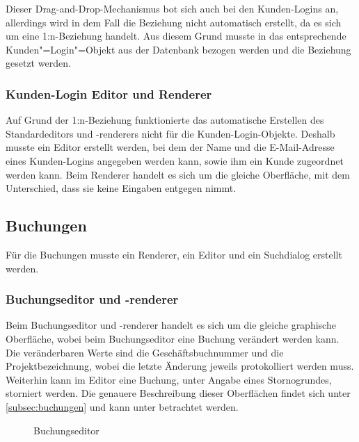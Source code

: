 Dieser Drag-and-Drop-Mechanismus bot sich auch bei den Kunden-Logins an, allerdings wird in dem Fall die Beziehung nicht automatisch erstellt, da es sich um eine 1:n-Beziehung handelt.
Aus diesem Grund musste in das entsprechende Kunden"=Login"=Objekt aus der Datenbank bezogen werden und die Beziehung gesetzt werden.


\subsubsection{Kunden-Login Editor und Renderer}
Auf Grund der 1:n-Beziehung funktionierte das automatische Erstellen des Standardeditors und -renderers nicht für die Kunden-Login-Objekte.
Deshalb musste ein Editor erstellt werden, bei dem der Name und die E-Mail-Adresse eines Kunden-Logins angegeben werden kann, sowie ihm ein Kunde zugeordnet werden kann.
Beim Renderer handelt es sich um die gleiche Oberfläche, mit dem Unterschied, dass sie keine Eingaben entgegen nimmt. 

\subsection{Buchungen}
Für die Buchungen musste ein Renderer, ein Editor und ein Suchdialog erstellt werden.

\subsubsection{Buchungseditor und -renderer}
Beim Buchungseditor und -renderer handelt es sich um die gleiche graphische Oberfläche, wobei beim Buchungseditor eine Buchung verändert werden kann.
Die veränderbaren Werte sind die Geschäftsbuchnummer und die Projektbezeichnung, wobei die letzte Änderung jeweils protokolliert werden muss.
Weiterhin kann im Editor eine Buchung, unter Angabe eines Stornogrundes, storniert werden.
Die genauere Beschreibung dieser Oberflächen findet sich unter \autoref{subsec:buchungen} und kann unter  betrachtet werden.

\begin{figure}[htbp]
	\centering
	\caption{Buchungseditor}
	\label{fig:buchungseditor}
\end{figure}

